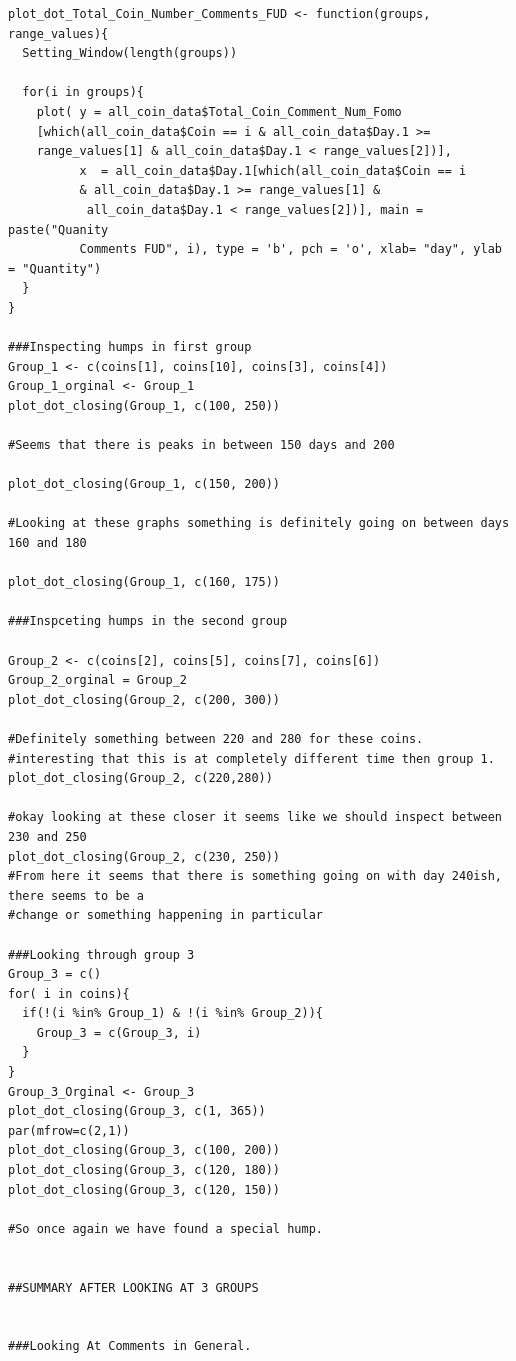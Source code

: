\documentclass[12pt]{article}
\begin{document}
{\begin{verbatim}
plot_dot_Total_Coin_Number_Comments_FUD <- function(groups, range_values){
  Setting_Window(length(groups))
  
  for(i in groups){
    plot( y = all_coin_data$Total_Coin_Comment_Num_Fomo
    [which(all_coin_data$Coin == i & all_coin_data$Day.1 >= 
    range_values[1] & all_coin_data$Day.1 < range_values[2])],
          x  = all_coin_data$Day.1[which(all_coin_data$Coin == i 
          & all_coin_data$Day.1 >= range_values[1] &
           all_coin_data$Day.1 < range_values[2])], main = paste("Quanity 
          Comments FUD", i), type = 'b', pch = 'o', xlab= "day", ylab = "Quantity")
  }
}

###Inspecting humps in first group
Group_1 <- c(coins[1], coins[10], coins[3], coins[4])
Group_1_orginal <- Group_1
plot_dot_closing(Group_1, c(100, 250))

#Seems that there is peaks in between 150 days and 200

plot_dot_closing(Group_1, c(150, 200))

#Looking at these graphs something is definitely going on between days 160 and 180

plot_dot_closing(Group_1, c(160, 175))

###Inspceting humps in the second group

Group_2 <- c(coins[2], coins[5], coins[7], coins[6])
Group_2_orginal = Group_2
plot_dot_closing(Group_2, c(200, 300))

#Definitely something between 220 and 280 for these coins. 
#interesting that this is at completely different time then group 1.
plot_dot_closing(Group_2, c(220,280))

#okay looking at these closer it seems like we should inspect between 230 and 250
plot_dot_closing(Group_2, c(230, 250))
#From here it seems that there is something going on with day 240ish, there seems to be a 
#change or something happening in particular

###Looking through group 3
Group_3 = c()
for( i in coins){
  if(!(i %in% Group_1) & !(i %in% Group_2)){
    Group_3 = c(Group_3, i)
  }
}
Group_3_Orginal <- Group_3
plot_dot_closing(Group_3, c(1, 365))
par(mfrow=c(2,1))
plot_dot_closing(Group_3, c(100, 200))
plot_dot_closing(Group_3, c(120, 180))
plot_dot_closing(Group_3, c(120, 150))

#So once again we have found a special hump. 


##SUMMARY AFTER LOOKING AT 3 GROUPS

  
###Looking At Comments in General.


\end{verbatim}}
\end{document}
